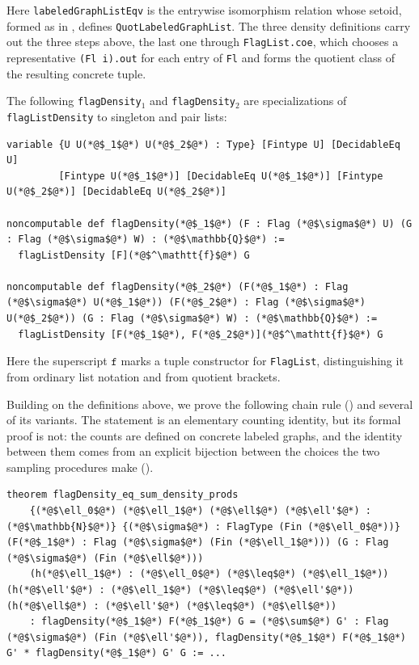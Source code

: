 \documentclass[acmsmall,screen=true,acmthm=false]{acmart}
\DeclareRobustCommand{\lean}[1]{{\def\_{\textunderscore\allowbreak}\texttt{#1}}}
\begin{document}
Here \lean{labeledGraphListEqv} is the entrywise isomorphism relation whose
setoid, formed as in , defines
\lean{QuotLabeledGraphList}.  The three density definitions carry out the
three steps above, the last one through \lean{FlagList.coe}, which chooses a
representative \lean{(Fl i).out} for each entry of \lean{Fl} and forms the
quotient class of the resulting concrete tuple.

The following \lean{flagDensity}$_1$ and \lean{flagDensity}$_2$ are
specializations of \lean{flagListDensity} to singleton and pair lists:
\begin{lstlisting}
variable {U U(*@$_1$@*) U(*@$_2$@*) : Type} [Fintype U] [DecidableEq U]
         [Fintype U(*@$_1$@*)] [DecidableEq U(*@$_1$@*)] [Fintype U(*@$_2$@*)] [DecidableEq U(*@$_2$@*)]

noncomputable def flagDensity(*@$_1$@*) (F : Flag (*@$\sigma$@*) U) (G : Flag (*@$\sigma$@*) W) : (*@$\mathbb{Q}$@*) :=
  flagListDensity [F](*@$^\mathtt{f}$@*) G

noncomputable def flagDensity(*@$_2$@*) (F(*@$_1$@*) : Flag (*@$\sigma$@*) U(*@$_1$@*)) (F(*@$_2$@*) : Flag (*@$\sigma$@*) U(*@$_2$@*)) (G : Flag (*@$\sigma$@*) W) : (*@$\mathbb{Q}$@*) :=
  flagListDensity [F(*@$_1$@*), F(*@$_2$@*)](*@$^\mathtt{f}$@*) G
\end{lstlisting}
Here the superscript \(\mathtt{f}\) marks a tuple constructor for
\lean{FlagList}, distinguishing it from ordinary list notation and from
quotient brackets.

Building on the definitions above, we prove the following chain rule
() and several of its variants.
The statement is an elementary counting identity, but its formal proof is not:
the counts are defined on concrete labeled graphs, and the identity between
them comes from an explicit bijection between the choices the two sampling
procedures make ().
\begin{lstlisting}
theorem flagDensity_eq_sum_density_prods
    {(*@$\ell_0$@*) (*@$\ell_1$@*) (*@$\ell$@*) (*@$\ell'$@*) : (*@$\mathbb{N}$@*)} {(*@$\sigma$@*) : FlagType (Fin (*@$\ell_0$@*))} (F(*@$_1$@*) : Flag (*@$\sigma$@*) (Fin (*@$\ell_1$@*))) (G : Flag (*@$\sigma$@*) (Fin (*@$\ell$@*)))
    (h(*@$\ell_1$@*) : (*@$\ell_0$@*) (*@$\leq$@*) (*@$\ell_1$@*)) (h(*@$\ell'$@*) : (*@$\ell_1$@*) (*@$\leq$@*) (*@$\ell'$@*)) (h(*@$\ell$@*) : (*@$\ell'$@*) (*@$\leq$@*) (*@$\ell$@*))
    : flagDensity(*@$_1$@*) F(*@$_1$@*) G = (*@$\sum$@*) G' : Flag (*@$\sigma$@*) (Fin (*@$\ell'$@*)), flagDensity(*@$_1$@*) F(*@$_1$@*) G' * flagDensity(*@$_1$@*) G' G := ...
\end{lstlisting}
\end{document}
